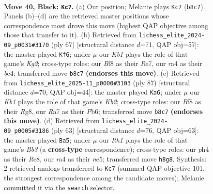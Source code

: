 \documentclass[11pt]{article}
\begin{document}
\clearpage

\begin{figure}[p]\centering
\begin{subfigure}{0.46\textwidth}\centering
\resizebox{\linewidth}{!}{%
\newchessgame
\chessboard[
  setfen={1k3b1r/rp4p1/p1p4p/P2b1p2/R1p4P/2B1P1P1/1P3P1N/2K3R1 b - - 3 40},
  showmover=false,
  pgfstyle=straightmove, color=movearrow, markmove={b8-c7}
]}
\caption{}
\end{subfigure}\hfill
\begin{subfigure}{0.46\textwidth}\centering
\resizebox{\linewidth}{!}{%
\newchessgame
\chessboard[
  setfen={3r4/1b2r1k1/p5p1/P3pp1p/2Bp3P/3P1P2/1PPR2P1/4R1K1 b - - 0 34},
  showmover=false,
  pgfstyle=straightmove, color=movearrow, markmove={g7-f6}
]}
\caption{}
\end{subfigure}
\\[4pt]
\begin{subfigure}{0.46\textwidth}\centering
\resizebox{\linewidth}{!}{%
\newchessgame
\chessboard[
  setfen={6r1/1kp4r/1p1b4/3Pp2p/2R1Pp2/pP3P2/P5PR/4BK2 b - - 14 44},
  showmover=false,
  pgfstyle=straightmove, color=movearrow, markmove={b7-a6}
]}
\caption{}
\end{subfigure}\hfill
\begin{subfigure}{0.46\textwidth}\centering
\resizebox{\linewidth}{!}{%
\newchessgame
\chessboard[
  setfen={2b1r1k1/5ppp/rb2p3/2p1N3/P4P2/1PRPB1P1/6BP/6K1 b - - 0 32},
  showmover=false,
  pgfstyle=straightmove, color=movearrow, markmove={b6-a5}
]}
\caption{}
\end{subfigure}
\caption{\textbf{Move 40, Black: \texttt{Kc7}.} (a) Our position; Melanie plays \texttt{Kc7} (\texttt{b8c7}). Panels (b)--(d) are the retrieved master positions whose correspondence most drove this move (highest QAP objective among those that transfer to it). (b) Retrieved from \texttt{lichess\_elite\_2024-09\_p0031\#3170} (ply 67) [structural distance $d$=71, QAP obj=57]: the master played \texttt{Kf6}; under $\mu$ our \emph{Kb1} plays the role of that game's \emph{Kg2}; cross-type roles: our \emph{B}f8 as their \emph{R}e7, our \emph{r}a4 as their \emph{b}c4; transferred move \texttt{b8c7} \textbf{(endorses this move)}. (c) Retrieved from \texttt{lichess\_elite\_2025-11\_p0000\#3103} (ply 87) [structural distance $d$=70, QAP obj=44]: the master played \texttt{Ka6}; under $\mu$ our \emph{Kb1} plays the role of that game's \emph{Kb2}; cross-type roles: our \emph{B}f8 as their \emph{R}g8, our \emph{R}a7 as their \emph{P}b6; transferred move \texttt{b8c7} \textbf{(endorses this move)}. (d) Retrieved from \texttt{lichess\_elite\_2024-09\_p0005\#3186} (ply 63) [structural distance $d$=76, QAP obj=63]: the master played \texttt{Ba5}; under $\mu$ our \emph{Rh1} plays the role of that game's \emph{Bb3} (a \textbf{cross-type} correspondence); cross-type roles: our \emph{p}h4 as their \emph{R}e8, our \emph{r}a4 as their \emph{n}e5; transferred move \texttt{h8g8}. Synthesis: 2 retrieved analogs transferred to \texttt{Kc7} (summed QAP objective 101, the strongest correspondence among the candidate moves); Melanie committed it via the \texttt{search} selector.}
\label{fig:thought-m79}
\end{figure}
\end{document}
